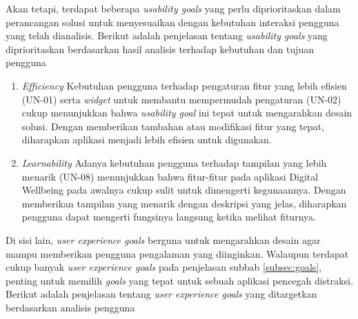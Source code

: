 Akan tetapi, terdapat beberapa \textit{usability goals} yang perlu diprioritaskan dalam perancangan solusi untuk menyesuaikan dengan kebutuhan interaksi pengguna yang telah dianalisis. Berikut adalah penjelasan tentang \textit{usability goals} yang diprioritaskan berdasarkan hasil analisis terhadap kebutuhan dan tujuan pengguna

\begin{enumerate}
  \item \textit{Efficiency}
  \subitem Kebutuhan pengguna terhadap pengaturan fitur yang lebih efisien (UN-01) serta \textit{widget} untuk membantu mempermudah pengaturan (UN-02) cukup menunjukkan bahwa \textit{usability goal} ini tepat untuk mengarahkan desain solusi. Dengan memberikan tambahan atau modifikasi fitur yang tepat, diharapkan aplikasi menjadi lebih efisien untuk digunakan. 

  \item \textit{Learnability}
  \subitem Adanya kebutuhan pengguna terhadap tampilan yang lebih menarik (UN-08) menunjukkan bahwa fitur-fitur pada aplikasi Digital Wellbeing pada awalnya cukup sulit untuk dimengerti kegunaannya. Dengan memberikan tampilan yang menarik dengan deskripsi yang jelas, diharapkan pengguna dapat mengerti fungsinya langsung ketika melihat fiturnya.
  
\end{enumerate}

Di sisi lain, \textit{user experience goals} berguna untuk mengarahkan desain agar mampu memberikan pengguna pengalaman yang diinginkan. Walaupun terdapat cukup banyak \textit{user experience goals} pada penjelasan subbab \ref{subsec:goals}, penting untuk memilih \textit{goals} yang tepat untuk sebuah aplikasi pencegah distraksi. Berikut adalah penjelasan tentang \textit{user experience goals} yang ditargetkan berdasarkan analisis pengguna

